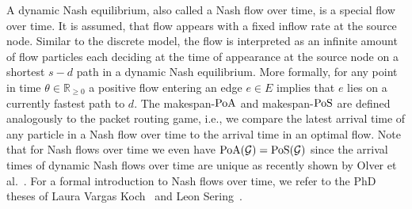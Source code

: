 A dynamic Nash equilibrium, also called a Nash flow over time, is a special flow over time. It is assumed, that flow appears with a fixed inflow rate at the source node. Similar to the discrete model, the flow is interpreted as an infinite amount of flow particles each deciding at the time of appearance at the source node on a shortest $s-d$ path in a dynamic Nash equilibrium. More formally, for any point in time $\theta \in \mathbb{R}_{\geq 0}$ a positive flow entering an edge $e \in E$ implies that $e$ lies on a currently fastest path to $d$. The makespan-$\operatorname*{PoA}$ and makespan-$\operatorname*{PoS}$ are defined analogously to the packet routing game, i.e., we compare the latest arrival time of any particle in a Nash flow over time to the arrival time in an optimal flow. Note that for Nash flows over time we even have $\operatorname*{PoA}(\mathcal{G})=\operatorname*{PoS}(\mathcal{G})$ since the arrival times of dynamic Nash flows over time are unique as recently shown by Olver et al.~\cite{DBLP:conf/focs/OlverSK21}.
For a formal introduction to Nash flows over time, we refer to the PhD theses of Laura Vargas Koch~\cite{PhDLaura} and Leon Sering~\cite{PhDLeon}.


